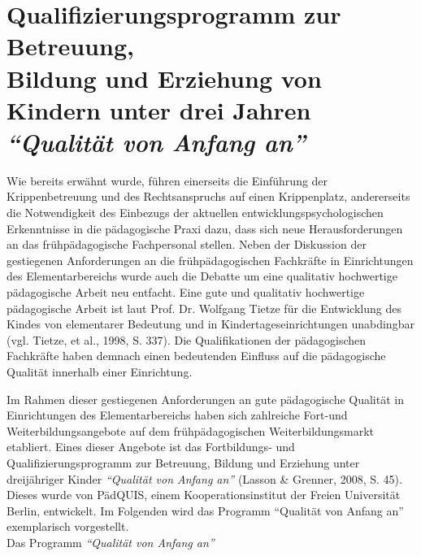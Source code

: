 \documentclass[12pt,a4paper]{article}
\begin{document}
 \section{Qualifizierungsprogramm zur Betreuung, \\Bildung und Erziehung von Kindern unter  drei Jahren \textit{"`Qualität von Anfang an"'}}
 
Wie bereits erwähnt wurde, führen einerseits die Einführung der Krippenbetreuung und des Rechtsanspruchs auf einen Krippenplatz, andererseits die Notwendigkeit des Einbezugs der aktuellen entwicklungspsychologischen Erkenntnisse in die pädagogische Praxi dazu, dass sich neue Herausforderungen an das frühpädagogische Fachpersonal stellen. Neben der Diskussion der gestiegenen Anforderungen an die frühpädagogischen Fachkräfte in Einrichtungen des Elementarbereichs wurde auch die Debatte um eine qualitativ hochwertige pädagogische Arbeit neu entfacht. Eine gute und qualitativ hochwertige pädagogische Arbeit ist laut Prof. Dr. Wolfgang Tietze für die Entwicklung des Kindes von elementarer Bedeutung und in Kindertageseinrichtungen unabdingbar (vgl. Tietze, et al., 1998, S. 337). Die Qualifikationen der pädagogischen Fachkräfte haben demnach einen bedeutenden Einfluss auf die pädagogische Qualität innerhalb einer Einrichtung. 

	Im Rahmen dieser gestiegenen Anforderungen an gute pädagogische Qualität in Einrichtungen des Elementarbereichs haben sich zahlreiche Fort-und Weiterbildungsangebote auf dem frühpädagogischen Weiterbildungsmarkt etabliert. Eines dieser Angebote ist das Fortbildungs- und Qualifizierungsprogramm zur Betreuung, Bildung und Erziehung unter dreijähriger Kinder \textit{"`Qualität von Anfang an"'} (Lasson \& Grenner, 2008, S. 45). Dieses wurde von PädQUIS, einem Kooperationsinstitut der Freien Universität Berlin, entwickelt. Im Folgenden wird das Programm "`Qualität von Anfang an"' exemplarisch vorgestellt.\\

Das Programm \textit{"`Qualität von Anfang an"'}\\
\end{document}
